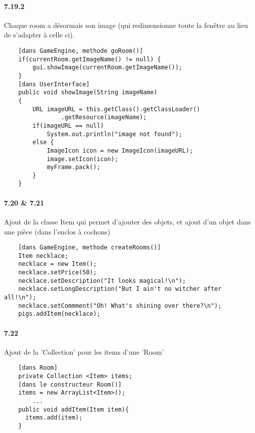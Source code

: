 \documentclass[11pt,a4paper]{report}
\begin{document}
\paragraph{7.19.2}
Chaque room a désormais son image (qui redimensionne toute la fenêtre au lieu de s'adapter à celle ci).
\newpage 
\begin{lstlisting}
    [dans GameEngine, methode goRoom()]
    if(currentRoom.getImageName() != null) {
    	gui.showImage(currentRoom.getImageName());
    }
    [dans UserInterface]
    public void showImage(String imageName)
    {
        URL imageURL = this.getClass().getClassLoader()
        		.getResource(imageName);
        if(imageURL == null)
            System.out.println("image not found");
        else {
            ImageIcon icon = new ImageIcon(imageURL);
            image.setIcon(icon);
            myFrame.pack();
        }
    }
\end{lstlisting}

\paragraph{7.20 \& 7.21}
Ajout de la classe Item qui permet d'ajouter des objets, et ajout d'un objet dans une pièce (dans l'enclos à cochons)
\begin{lstlisting}
    [dans GameEngine, methode createRooms()]
    Item necklace;
    necklace = new Item();
    necklace.setPrice(50);
    necklace.setDescription("It looks magical!\n");
    necklace.setLongDescription("But I ain't no witcher after all!\n");
    necklace.setCommment("Oh! What's shining over there?\n");
    pigs.addItem(necklace);
\end{lstlisting}

\paragraph{7.22}

Ajout de la 'Collection' pour les items d'une 'Room'
\begin{lstlisting}
    [dans Room]
    private Collection <Item> items;
    [dans le constructeur Room()]
    items = new ArrayList<Item>();
		...
    public void addItem(Item item){
      items.add(item);
    }
\end{lstlisting}
\end{document}
